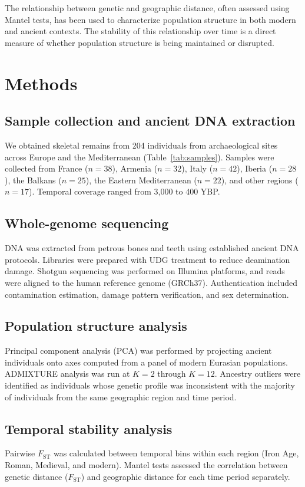 \documentclass[11pt]{article}
\begin{document}
The relationship between genetic and geographic distance, often assessed using Mantel tests, has been used to characterize population structure in both modern \citep{novembre2008genes} and ancient contexts. The stability of this relationship over time is a direct measure of whether population structure is being maintained or disrupted.

\section{Methods}

\subsection{Sample collection and ancient DNA extraction}
We obtained skeletal remains from 204 individuals from archaeological sites across Europe and the Mediterranean (Table~\ref{tab:samples}). Samples were collected from France ($n=38$), Armenia ($n=32$), Italy ($n=42$), Iberia ($n=28$), the Balkans ($n=25$), the Eastern Mediterranean ($n=22$), and other regions ($n=17$). Temporal coverage ranged from 3,000 to 400 YBP.

\subsection{Whole-genome sequencing}
DNA was extracted from petrous bones and teeth using established ancient DNA protocols. Libraries were prepared with UDG treatment to reduce deamination damage. Shotgun sequencing was performed on Illumina platforms, and reads were aligned to the human reference genome (GRCh37). Authentication included contamination estimation, damage pattern verification, and sex determination.

\subsection{Population structure analysis}
Principal component analysis (PCA) was performed by projecting ancient individuals onto axes computed from a panel of modern Eurasian populations. ADMIXTURE analysis was run at $K=2$ through $K=12$. Ancestry outliers were identified as individuals whose genetic profile was inconsistent with the majority of individuals from the same geographic region and time period.

\subsection{Temporal stability analysis}
Pairwise $F_\text{ST}$ was calculated between temporal bins within each region (Iron Age, Roman, Medieval, and modern). Mantel tests assessed the correlation between genetic distance ($F_\text{ST}$) and geographic distance for each time period separately.
\end{document}
